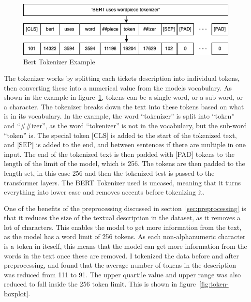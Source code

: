 \documentclass{UoYCSproject}
\begin{document}
    \begin{figure}[h]
        \includegraphics[width=\textwidth]{./figures/tokenizer-example}
        \caption{Bert Tokenizer Example}
        \label{fig:tokenizer-figure}
    \end{figure}

    The tokenizer works by splitting each tickets description into individual tokens, then converting these into a numerical value from the models vocabulary.
    As shown in the example in figure~\ref{fig:tokenizer-figure}, tokens can be a single word, or a sub-word, or a character. The tokenizer breaks down the text into these tokens based on what is in its vocabulary.
    In the example, the word ``tokenizer'' is split into ``token'' and ``\#\#izer'', as the word ``tokenizer'' is not in the vocabulary, but the sub-word ``token'' is.
    The special token [CLS] is added to the start of the tokenized text, and [SEP] is added to the end, and between sentences if there are multiple in one input.
    The end of the tokenized text is then padded with [PAD] tokens to the length of the limit of the model, which is 256.
    The tokens are then padded to the length set, in this case 256 and then the tokenized test is passed to the transformer layers.
    The BERT Tokenizer used is uncased, meaning that it turns everything into lower case and removes accents before tokenizing it.
    \par

    One of the benefits of the preprocessing discussed in section~\ref{sec:preprocessing} is that it reduces the size of the textual description in the dataset, as it removes a lot of characters.
    This enables the model to get more information from the text, as the model has a word limit of 256 tokens. As each non-alphanumeric character is a token in iteself, this means that the model can get more information from the words in the text once these are removed.
    I tokenized the data before and after preprocessing, and found that the average number of tokens in the description was reduced from 111 to 91. The upper quartile value and upper range was also reduced to fall inside the 256 token limit.
    This is shown in figure~\ref{fig:token-boxplot}.
\end{document}
